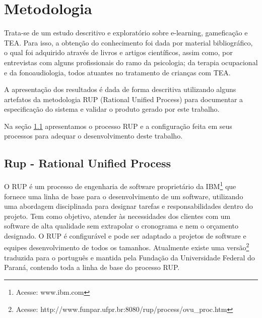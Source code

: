 \chapter{Metodologia}\label{cap:metodologia}
Trata-se de um estudo descritivo e exploratório sobre e-learning, gameficação e TEA. Para isso, a obtenção do conhecimento foi dada por material bibliográfico, o qual foi adquirido através de livros e artigos científicos, assim como, por entrevistas com alguns profissionais do ramo da psicologia; da terapia ocupacional e da fonoaudiologia, todos atuantes no tratamento de crianças com TEA.

A apresentação dos resultados é dada de forma descritiva utilizando alguns artefatos da metodologia RUP (Rational Unified Process) para documentar a especificação do sistema e validar o produto gerado por este trabalho.

Na seção \ref{rup} apresentamos o processo RUP e a configuração feita em seus processos para adequar o desenvolvimento deste trabalho.

\section{Rup - Rational Unified Process}\label{rup}
O RUP é um processo de engenharia de software proprietário da IBM\footnote{Acesse: www.ibm.com} que fornece uma linha de base para o desenvolvimento de um software, utilizando uma abordagem disciplinada para designar tarefas e responsabilidades dentro do projeto. Tem como objetivo, atender às necessidades dos clientes com um software de alta qualidade sem extrapolar o cronograma e nem o orçamento designado. O RUP é configurável e pode ser adaptado a projetos de software e equipes desenvolvimento de todos os tamanhos. Atualmente existe uma versão\footnote{Acesse: http://www.funpar.ufpr.br:8080/rup/process/ovu\_proc.htm} traduzida para o português e mantida pela Fundação da Universidade Federal do Paraná, contendo toda a linha de base do processo RUP.


